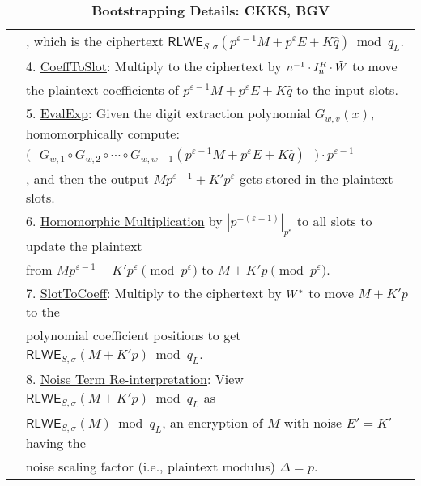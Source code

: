 \begin{table}[h]
\begin{tabular}{|c||l|}
& \text{ } \text{ } , which is the ciphertext $\textsf{RLWE}_{S, \sigma}(p^{\varepsilon-1}M + p^\varepsilon E + K\hat{q}) \bmod q_L$.\\
&4. \underline{\textsf{CoeffToSlot}}: Multiply to the ciphertext by $n^{-1}\cdot I_n^R \cdot \tilde W$ to move\\
& \text{ } \text{ } the plaintext coefficients of $p^{\varepsilon-1}M + p^\varepsilon E + K\hat{q}$ to the input slots.\\
&5. \underline{\textsf{EvalExp}}: Given the digit extraction polynomial $G_{w, v}(x)$, homomorphically compute:\\
&\text{ } \text{ } $\bm(\text{ } G_{w, 1} \circ G_{w, 2}\circ \cdots \circ G_{w, w-1} (p^{\varepsilon-1} M + p^\varepsilon E + K\hat{q})\text{ } \bm) \cdot p^{\varepsilon-1}$\\
&\text{ } \text{ } , and then the output $Mp^{\varepsilon - 1} + K'p^\varepsilon$ gets stored in the plaintext slots.\\
&6. \underline{Homomorphic Multiplication} by $|p^{-(\varepsilon-1)}|_{p^\varepsilon}$ to all slots to update the plaintext \\
&\text{ } \text{ }  from $Mp^{\varepsilon - 1} + K'p^\varepsilon \pmod{p^\varepsilon}$ to $M + K'p \pmod{p^\varepsilon}$.\\
&7. \underline{\textsf{SlotToCoeff}}: Multiply to the ciphertext by $\tilde W^*$ to move $M + K'p$ to the \\
&\text{ } \text{ } polynomial coefficient positions to get $\textsf{RLWE}_{S, \sigma}(M + K'p) \bmod q_L$.\\
&8. \underline{Noise Term Re-interpretation}: View $\textsf{RLWE}_{S, \sigma}(M + K'p) \bmod q_L$ as\\
&\text{ } \text{ }  $\textsf{RLWE}_{S, \sigma}(M) \bmod q_L$, an encryption of $M$ with noise $E' = K'$ having the\\
& \text{ } \text{ } noise scaling factor (i.e., plaintext modulus) $\Delta = p$.\\\hline
\end{tabular}
\caption{\textbf{Bootstrapping Details: CKKS, BGV}}
\end{table}

